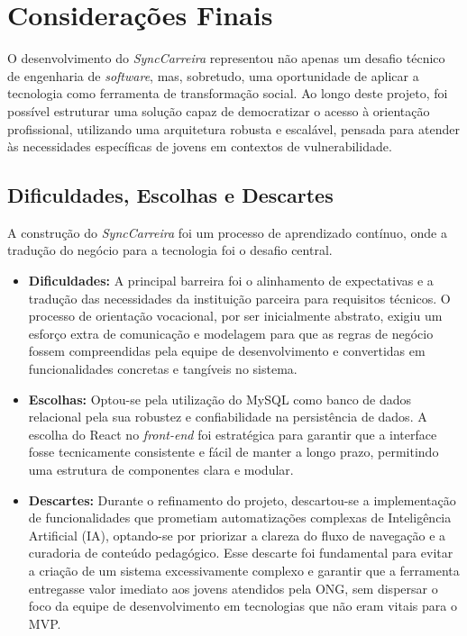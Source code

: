 \chapter{Considerações Finais}

O desenvolvimento do \textit{SyncCarreira} representou não apenas um desafio técnico de engenharia de \textit{software}, mas, sobretudo, uma oportunidade de aplicar a tecnologia como ferramenta de transformação social. Ao longo deste projeto, foi possível estruturar uma solução capaz de democratizar o acesso à orientação profissional, utilizando uma arquitetura robusta e escalável, pensada para atender às necessidades específicas de jovens em contextos de vulnerabilidade.

\section{Dificuldades, Escolhas e Descartes}

A construção do \textit{SyncCarreira} foi um processo de aprendizado contínuo, onde a tradução do negócio para a tecnologia foi o desafio central.

\begin{itemize}
    \item \textbf{Dificuldades:} A principal barreira foi o alinhamento de expectativas e a tradução das necessidades da instituição parceira para requisitos técnicos. O processo de orientação vocacional, por ser inicialmente abstrato, exigiu um esforço extra de comunicação e modelagem para que as regras de negócio fossem compreendidas pela equipe de desenvolvimento e convertidas em funcionalidades concretas e tangíveis no sistema.

    \item \textbf{Escolhas:} Optou-se pela utilização do MySQL como banco de dados relacional pela sua robustez e confiabilidade na persistência de dados. A escolha do React no \textit{front-end} foi estratégica para garantir que a interface fosse tecnicamente consistente e fácil de manter a longo prazo, permitindo uma estrutura de componentes clara e modular.

    \item \textbf{Descartes:} Durante o refinamento do projeto, descartou-se a implementação de funcionalidades que prometiam automatizações complexas de Inteligência Artificial (IA), optando-se por priorizar a clareza do fluxo de navegação e a curadoria de conteúdo pedagógico. Esse descarte foi fundamental para evitar a criação de um sistema excessivamente complexo e garantir que a ferramenta entregasse valor imediato aos jovens atendidos pela ONG, sem dispersar o foco da equipe de desenvolvimento em tecnologias que não eram vitais para o MVP.
\end{itemize}
